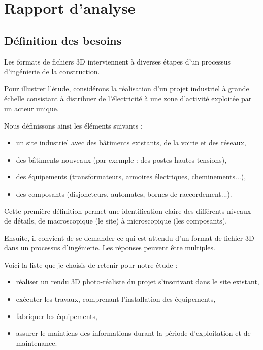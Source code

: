 \section{Rapport d'analyse}

\subsection{Définition des besoins}

Les formats de fichiers 3D interviennent à diverses étapes d'un processus d'ingénierie de la construction.

Pour illustrer l'étude, considérons la réalisation d'un projet industriel à grande échelle consistant à distribuer de l'électricité à une zone d'activité exploitée par un acteur unique. 

Nous définissons ainsi les éléments suivants :
\begin{itemize}
    \item un site industriel avec des bâtiments existants, de la voirie et des réseaux,
    \item des bâtiments nouveaux (par exemple : des postes hautes tensions),
    \item des équipements (transformateurs, armoires électriques, cheminements...), 
    \item des composants (disjoncteurs, automates, bornes de raccordement...).
\end{itemize}

Cette première définition permet une identification claire des différents niveaux de détails, de macroscopique (le site) à microscopique (les composants).

Ensuite, il convient de se demander ce qui est attendu d'un format de fichier 3D dans un processus d'ingénierie. Les réponses peuvent être multiples. 

Voici la liste que je choisis de retenir pour notre étude :

\begin{itemize}
    \item réaliser un rendu 3D photo-réaliste du projet s'inscrivant dans le site existant,
    \item exécuter les travaux, comprenant l'installation des équipements,
    \item fabriquer les équipements,
    \item assurer le maintiens des informations durant la période d'exploitation et de maintenance.
\end{itemize}

